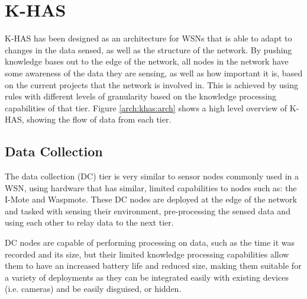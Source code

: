 	\section{K-HAS}
		K-HAS has been designed as an architecture for WSNs that is able to adapt to changes in the data sensed, as well as the structure of the network. By pushing knowledge bases out to the edge of the network, all nodes in the network have some awareness of the data they are sensing, as well as how important it is, based on the current projects that the network is involved in. This is achieved by using rules with different levels of granularity based on the knowledge processing capabilities of that tier. Figure \ref{arch:khas:arch} shows a high level overview of K-HAS, showing the flow of data from each tier.
	
	\subsection{Data Collection}\label{khas:dc}
	The data collection (DC) tier is very similar to sensor nodes commonly used in a WSN, using hardware that has similar, limited capabilities to nodes such as: the I-Mote and Waspmote. These DC nodes are deployed at the edge of the network and tasked with sensing their environment, pre-processing the sensed data and using each other to relay data to the next tier.

	DC nodes are capable of performing processing on data, such as the time it was recorded and its size, but their limited knowledge processing capabilities allow them to have an increased battery life and reduced size, making them suitable for a variety of deployments as they can be integrated easily with existing devices (i.e. cameras) and be easily disguised, or hidden.
